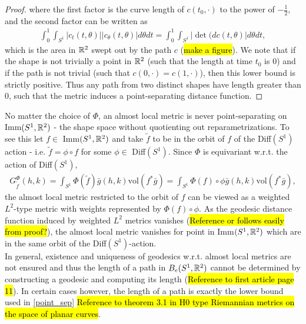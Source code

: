 \begin{proof}
where the first factor is the curve length of $c(t_0, \cdot)$ to the power of $-\frac{1}{2}$, and the second factor can be written as
\begin{align*}
\int_0^1 \int_{S^1} \left| c_t(t, \theta) \right| \left| c_\theta(t, \theta) \right| d \theta dt = \int_0^1 \int_{S^1} \left| \det (d c(t, \theta) \right| d \theta dt,
\end{align*}
which is the area in $\mathbb{R}^2$ swept out by the path $c$ (\hl{make a figure}). We note that if the shape is not trivially a point in $\mathbb{R}^2$ (such that the length at time $t_0$ is $0$) and if the path is not trivial (such that $c(0, \cdot) = c(1, \cdot)$), then this lower bound is strictly positive. Thus any path from two distinct shapes have length greater than $0$, such that the metric induces a point-separating distance function. 
\end{proof}


No matter the choice of $\Phi$, an almost local metric is never point-separating on Imm$(S^1, \mathbb{R}^2)$ - the shape space without quotienting out reparametrizations. To see this let $f \in$ Imm$(S^1, \mathbb{R}^2)$ and take $\tilde{f}$ to be in the orbit of $f$ of the Diff$(S^1)$ action - i.e. $\tilde{f} = \phi \circ f$ for some $\phi \in$ Diff$(S^1)$. Since $\Phi$ is equivariant w.r.t. the action of Diff$(S^1)$, 
\begin{align*}
G_{\tilde{f}}^\Phi (h,k) = \int_{S^1} \Phi(\tilde{f}) \bar{g}(h,k) \text{vol}(f^* \bar{g}) = \int_{S^1} \Phi(f) \circ \phi \bar{g}(h,k) \text{vol}(f^* \bar{g}),
\end{align*}
the almost local metric restricted to the orbit of $f$ can be viewed as a weighted $L^2$-type metric with weights represented by $\Phi(f) \circ \phi$. As the geodesic distance function induced by weighted $L^2$ metrics vanishes (\hl{Reference or follows easily from proof?}), the almost local metric vanishes for point in Imm$(S^1, \mathbb{R}^2)$ which are in the same orbit of the Diff$(S^1)$-action.
\\[0.2 cm]
In general, existence and uniqueness of geodesics w.r.t. almost local metrics are not ensured and thus the length of a path in $B_e(S^1,\mathbb{R}^2)$ cannot be determined by constructing a geodesic and computing its length (\hl{Reference to first article page 11}). In certain cases however, the length of a path is exactly the lower bound used in \ref{point_sep} \hl{Reference to theorem 3.1 in H0 type Riemannian metrics on the space of planar curves}.

